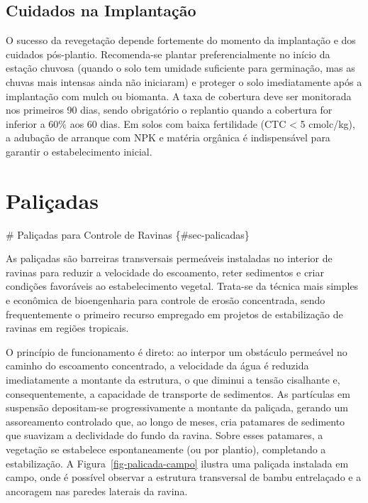 \documentclass[
  portuguese,
  11pt,
  a4paper,
  open=any]{scrbook}
\begin{document}
\section{Cuidados na Implantação}\label{cuidados-na-implantauxe7uxe3o}

\begin{tcolorbox}[enhanced jigsaw, leftrule=.75mm, colframe=quarto-callout-warning-color-frame, colback=white, bottomrule=.15mm, opacityback=0, colbacktitle=quarto-callout-warning-color!10!white, breakable, bottomtitle=1mm, opacitybacktitle=0.6, title=\textcolor{quarto-callout-warning-color}{\faExclamationTriangle}\hspace{0.5em}{Atenção}, titlerule=0mm, toprule=.15mm, toptitle=1mm, rightrule=.15mm, left=2mm, arc=.35mm, coltitle=black]

O sucesso da revegetação depende fortemente do momento da implantação e
dos cuidados pós-plantio. Recomenda-se plantar preferencialmente no
início da estação chuvosa (quando o solo tem umidade suficiente para
germinação, mas as chuvas mais intensas ainda não iniciaram) e proteger
o solo imediatamente após a implantação com mulch ou biomanta. A taxa de
cobertura deve ser monitorada nos primeiros 90 dias, sendo obrigatório o
replantio quando a cobertura for inferior a 60\% aos 60 dias. Em solos
com baixa fertilidade (CTC \textless{} 5 cmolc/kg), a adubação de
arranque com NPK e matéria orgânica é indispensável para garantir o
estabelecimento inicial.

\end{tcolorbox}

\chapter{Paliçadas}\label{paliuxe7adas}

\# Paliçadas para Controle de Ravinas \{\#sec-palicadas\}

As paliçadas são barreiras transversais permeáveis instaladas no
interior de ravinas para reduzir a velocidade do escoamento, reter
sedimentos e criar condições favoráveis ao estabelecimento vegetal.
Trata-se da técnica mais simples e econômica de bioengenharia para
controle de erosão concentrada, sendo frequentemente o primeiro recurso
empregado em projetos de estabilização de ravinas em regiões tropicais.

O princípio de funcionamento é direto: ao interpor um obstáculo
permeável no caminho do escoamento concentrado, a velocidade da água é
reduzida imediatamente a montante da estrutura, o que diminui a tensão
cisalhante e, consequentemente, a capacidade de transporte de
sedimentos. As partículas em suspensão depositam-se progressivamente a
montante da paliçada, gerando um assoreamento controlado que, ao longo
de meses, cria patamares de sedimento que suavizam a declividade do
fundo da ravina. Sobre esses patamares, a vegetação se estabelece
espontaneamente (ou por plantio), completando a estabilização. A
Figura~\ref{fig-palicada-campo} ilustra uma paliçada instalada em campo,
onde é possível observar a estrutura transversal de bambu entrelaçado e
a ancoragem nas paredes laterais da ravina.
\end{document}
